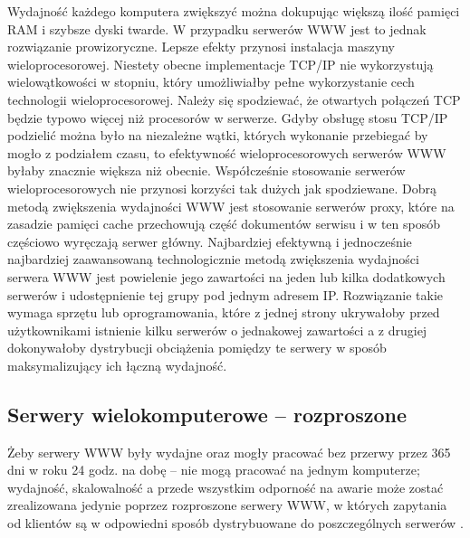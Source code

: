 Wydajność każdego komputera zwiększyć można dokupując większą ilość pamięci RAM i szybsze dyski twarde. 
W przypadku serwerów WWW jest to jednak rozwiązanie prowizoryczne. Lepsze efekty przynosi instalacja maszyny 
wieloprocesorowej. Niestety obecne implementacje TCP/IP nie wykorzystują wielowątkowości w stopniu, który 
umożliwiałby pełne wykorzystanie cech technologii wieloprocesorowej. Należy się spodziewać, że otwartych 
połączeń TCP będzie typowo więcej niż procesorów w serwerze. Gdyby obsługę stosu TCP/IP podzielić można było na 
niezależne wątki, których wykonanie przebiegać by mogło z podziałem czasu, to efektywność wieloprocesorowych 
serwerów WWW byłaby znacznie większa niż obecnie. Współcześnie stosowanie serwerów wieloprocesorowych nie 
przynosi korzyści tak dużych jak spodziewane. 
Dobrą metodą zwiększenia wydajności WWW jest stosowanie serwerów proxy, które na zasadzie pamięci cache 
przechowują część dokumentów serwisu i w ten sposób częściowo wyręczają serwer główny. 
Najbardziej efektywną i jednocześnie najbardziej zaawansowaną technologicznie metodą zwiększenia 
wydajności serwera WWW jest powielenie jego zawartości na jeden lub kilka dodatkowych serwerów i udostępnienie 
tej grupy pod jednym adresem IP. Rozwiązanie takie wymaga sprzętu lub oprogramowania, które z jednej strony 
ukrywałoby przed użytkownikami istnienie kilku serwerów o jednakowej zawartości a z drugiej dokonywałoby 
dystrybucji obciążenia pomiędzy te serwery w sposób maksymalizujący ich łączną wydajność.

\subsection{Serwery wielokomputerowe -- rozproszone}

\hspace{0.63cm}Żeby serwery WWW były wydajne oraz mogły pracować bez przerwy przez 365 dni w roku 24 godz. 
na dobę -- nie mogą pracować na jednym komputerze; wydajność, skalowalność a przede wszystkim odporność na 
awarie może zostać zrealizowana jedynie poprzez rozproszone serwery WWW, w których zapytania od klientów są
w odpowiedni sposób dystrybuowane do poszczególnych serwerów \cite{metodyalgorytmy}. 

